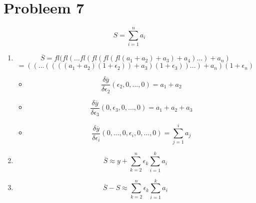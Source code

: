 \documentclass[12pt,a4paper]{article}
\begin{document}
\section{Probleem 7}
\[
S = \sum_{i=1}^na_i
\]
\begin{enumerate}
\item 
\[
\overline{S} = fl(fl(...fl(fl(fl(fl(a_1+a_2)+a_3)+a_4)...)+a_n)
\]
\[
= ((...((((a_1+a_2)(1+\epsilon_2))+a_3)(1+\epsilon_3))...)+a_n)(1+\epsilon_n)
\]

\begin{itemize}
\item
\[
\frac{\delta\overline{y}}{\delta \epsilon_2}(\epsilon_2,0,...,0)= a_1 + a_2
\]
\item
\[
\frac{\delta\overline{y}}{\delta \epsilon_3}(0,\epsilon_3,0,...,0)= a_1 + a_2 + a_3 
\]
\item
\[
\frac{\delta\overline{y}}{\delta \epsilon_i}(0,...,0,\epsilon_i,0,...,0) = \sum_{j=1}^ia_j
\]
\end{itemize}

\item
\[
\overline{S} \approx y + \sum_{k=2}^n\epsilon_k\sum_{i=1}^ka_i
\]

\item
\[
\overline{S}-S \approx \sum_{k=2}^n\epsilon_k\sum_{i=1}^ka_i
\]
\end{enumerate}
\end{document}
